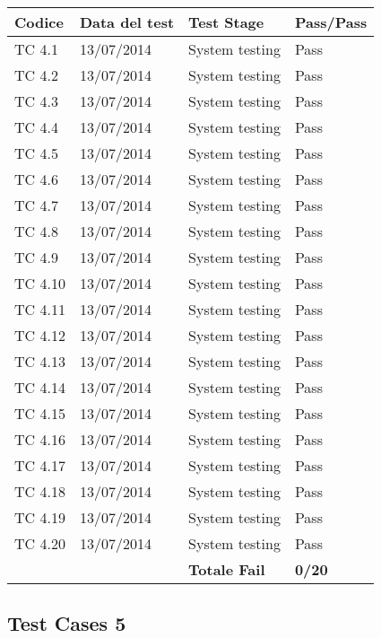 \begin{tabular}{|p{3cm}|p{3cm}|p{3cm}|p{3cm}|}
	\hline
	\rowcolor{Gray}
	\textbf{Codice} & \textbf{Data del test} & \textbf{Test Stage} & \textbf{Pass/Pass}\tabularnewline
	\hline
	TC 4.1			& 13/07/2014 			& System testing		& Pass \tabularnewline
	\hline
	TC 4.2			& 13/07/2014 			& System testing		& Pass \tabularnewline
	\hline
	TC 4.3			& 13/07/2014 			& System testing		& Pass \tabularnewline
	\hline
	TC 4.4			& 13/07/2014 			& System testing		& Pass \tabularnewline
	\hline
	TC 4.5			& 13/07/2014 			& System testing		& Pass \tabularnewline
	\hline
	TC 4.6			& 13/07/2014 			& System testing		& Pass \tabularnewline
	\hline
	TC 4.7			& 13/07/2014 			& System testing		& Pass \tabularnewline
	\hline
	TC 4.8			& 13/07/2014 			& System testing		& Pass \tabularnewline
	\hline
	TC 4.9			& 13/07/2014 			& System testing		& Pass \tabularnewline
	\hline
	TC 4.10			& 13/07/2014 			& System testing		& Pass \tabularnewline
	\hline
	TC 4.11			& 13/07/2014 			& System testing		& Pass \tabularnewline
	\hline
	TC 4.12			& 13/07/2014 			& System testing		& Pass \tabularnewline
	\hline
	TC 4.13			& 13/07/2014 			& System testing		& Pass \tabularnewline
	\hline
	TC 4.14			& 13/07/2014 			& System testing		& Pass \tabularnewline
	\hline
	TC 4.15			& 13/07/2014 			& System testing		& Pass \tabularnewline
	\hline
	TC 4.16			& 13/07/2014 			& System testing		& Pass \tabularnewline
	\hline
	TC 4.17			& 13/07/2014 			& System testing		& Pass \tabularnewline
	\hline
	TC 4.18			& 13/07/2014 			& System testing		& Pass \tabularnewline
	\hline
	TC 4.19			& 13/07/2014 			& System testing		& Pass \tabularnewline
	\hline
	TC 4.20			& 13/07/2014 			& System testing		& Pass \tabularnewline
	\hline
					& 						& \textbf{Totale Fail}	& \textbf{0/20} \tabularnewline
	\hline
\end{tabular}

\subsection{Test Cases 5}

